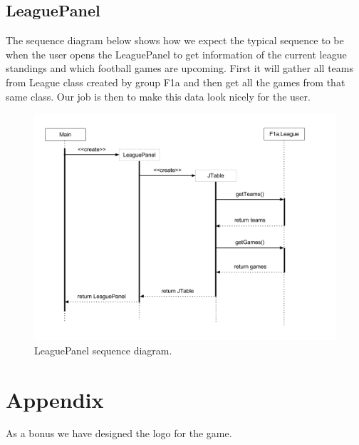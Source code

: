 \documentclass{article}
\begin{document}
\subsection{LeaguePanel}
The sequence diagram below shows how we expect the typical sequence to be when the user opens the LeaguePanel to get information of the current league standings and which football games are upcoming. First it will gather all teams from League class created by group F1a and then get all the games from that same class. Our job is then to make this data look nicely for the user.
\begin{figure}[H]
\centering
\includegraphics[width=\textwidth]{img/seq_diagram_2.png}
\caption{LeaguePanel sequence diagram.}
\end{figure}

\section{Appendix}
As a bonus we have designed the logo for the game.
\end{document}
